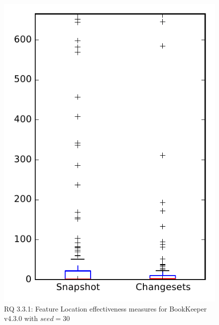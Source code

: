 
\begin{figure}
\centering
\includegraphics[height=0.4\textheight]{figures/flt_seed/rq1_bookkeeper_30}
\caption{RQ 3.3.1: Feature Location effectiveness measures for BookKeeper v4.3.0 with $seed=30$}
\label{fig:flt_seed:rq1:bookkeeper}
\end{figure}
